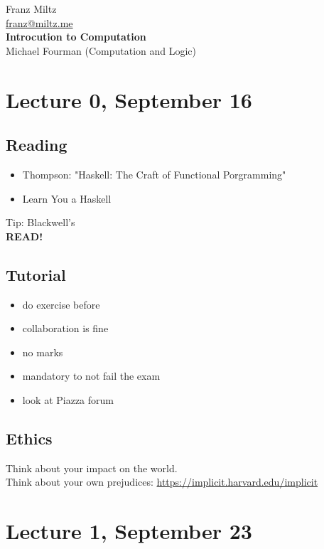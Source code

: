 \documentclass{article}
\theoremstyle{sltheorem}
\begin{document}
\begin{titlepage}
    \begin{center}
        
        \LARGE Franz Miltz\\
        \url{franz@miltz.me}\\
        \vspace{5cm}
        \LARGE\textbf{Introcution to Computation}\\
        \vspace{1cm}
        Michael Fourman (Computation and Logic)
    \end{center}
\end{titlepage}
\tableofcontents
\pagebreak
\section{Lecture 0, September 16}
\subsection{Reading}
\begin{itemize}
    \item Thompson: "Haskell: The Craft of Functional Porgramming"
    \item Learn You a Haskell
\end{itemize}
Tip: Blackwell's\\
\textbf{READ!}
\subsection{Tutorial}
\begin{itemize}
    \item do exercise before
    \item collaboration is fine
    \item no marks
    \item mandatory to not fail the exam
\end{itemize}
\begin{itemize}
    \item look at Piazza forum
\end{itemize}
\subsection{Ethics}
Think about your impact on the world.\\
Think about your own prejudices:
\url{https://implicit.harvard.edu/implicit}
\section{Lecture 1, September 23}
\end{document}
